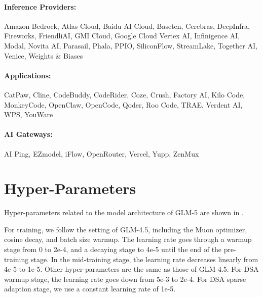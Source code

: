 \documentclass{article}
\theoremstyle{definition}
\begin{document}
\paragraph{Inference Providers:} Amazon Bedrock, Atlas Cloud, Baidu AI Cloud, Baseten, Cerebras, DeepInfra, Fireworks, FriendliAI, GMI Cloud, Google Cloud Vertex AI, Infinigence AI, Modal, Novita AI, Parasail, Phala, PPIO, SiliconFlow, StreamLake, Together AI, Venice, Weights \& Biases

\paragraph{Applications:} CatPaw, Cline, CodeBuddy, CodeRider, Coze, Crush, Factory AI, Kilo Code, MonkeyCode, OpenClaw, OpenCode, Qoder, Roo Code, TRAE, Verdent AI, WPS, YouWare

\paragraph{AI Gateways:} AI Ping, EZmodel, iFlow, OpenRouter, Vercel, Yupp, ZenMux

\clearpage




\clearpage

\appendix

\section{Hyper-Parameters}

Hyper-parameters related to the model architecture of GLM-5 are shown in .

For training, we follow the setting of GLM-4.5, including the Muon optimizer, cosine decay, and batch size warmup. The learning rate goes through a warmup stage from 0 to 2e-4, and a decaying stage to 4e-5 until the end of the pre-training stage. In the mid-training stage, the learning rate decreases linearly from 4e-5 to 1e-5. Other hyper-parameters are the same as those of GLM-4.5. For DSA warmup stage, the learning rate goes down from 5e-3 to 2e-4. For DSA sparse adaption stage, we use a constant learning rate of 1e-5.
\end{document}
